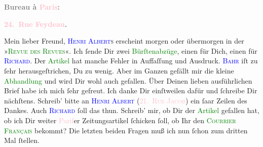           \pstart
           \begin{otherlanguage}{french}\textcolor{gray}{\textbf{\textbf{Bureau à \textcolor{pink}{Paris}{}\ledrightnote{\textcolor{pink}{Paris}}:}}}\end{otherlanguage}\pend
           \pstart
           \begin{otherlanguage}{french}\textcolor{gray}{\textbf{\textbf{\textcolor{pink}{24. Rue Feydeau}{}\ledrightnote{\textcolor{pink}{rue Feydeau}}.}}}\end{otherlanguage}\pend
           \pstart\center{}Mein lieber Freund,\pend\pstart
           \textsc{\textcolor{blue}{Henri Albert}{}\ledrightnote{\textcolor{blue}{Henri Albert}}s }{ }\label{K_L02732-1v}\label{K_L02732-1h} erscheint morgen oder übermorgen in der »\textsc{\textcolor{green}{Revue des Revues}{}\ledrightnote{\textcolor{green}{Revue des Revues}}}«. Ich ſende Dir zwei \textcolor{green}{Bürſtenabzüge}{}, einen für Dich, einen für \textsc{\textcolor{blue}{Richard}{}\ledrightnote{\textcolor{blue}{Richard Beer-Hofmann}}}. Der \textcolor{green}{Artikel}{} hat manche
               Fehler in Auffaſſung und Ausdruck. \textsc{\textcolor{blue}{Bahr}{}\ledrightnote{\textcolor{blue}{Hermann Bahr}}} iſt zu ſehr herausgeſtrichen, Du zu wenig. Aber im Ganzen gefällt mir die
               kleine \textcolor{green}{Abhandlung}{} und wird Dir
               wohl auch gefallen.\pend
           \pstart
           Über Deinen lieben ausführlichen Brief habe ich {\pb}mich ſehr gefreut. Ich danke Dir einſtweilen dafür und ſchreibe Dir nächſtens.\pend
           \pstart
           Schreib’ bitte an \textsc{\textcolor{blue}{Henri Albert}{}\ledrightnote{\textcolor{blue}{Henri Albert}}} (\textcolor{pink}{21. \textsc{Rue Jacob}}{}\ledrightnote{\textcolor{pink}{rue Jacob}}) ein ſaar Zeilen des Dankes. Auch \textsc{\textcolor{blue}{Richard}{}\ledrightnote{\textcolor{blue}{Richard Beer-Hofmann}}} ſoll das thun.\pend
           \pstart
           Schreib’ mir, ob Dir der \textcolor{green}{Artikel}{} gefallen hat, ob ich Dir weiter \textcolor{pink}{Pariſ}{}\ledrightnote{\textcolor{pink}{Paris}}er Zeitungsartikel ſchicken ſoll, ob Ihr den \textsc{\textcolor{green}{Courrier Français}{}\ledrightnote{\textcolor{green}{Le Courrier français}}} bekommt? Die letzten beiden Fragen muß ich nun ſchon zum dritten Mal ſtellen.
